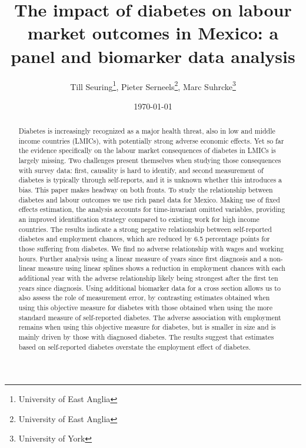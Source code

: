 \documentclass[12pt,english,british]{article}
\begin{document}
\title{The impact of diabetes on labour market outcomes in Mexico: a panel and biomarker data analysis}

\author{Till Seuring\footnote{University of East Anglia}, Pieter
Serneels\footnote{University of East Anglia}, Marc Suhrcke\footnote{University
  of York}}
\affil{}

\date{\today}


\maketitle 

\begin{abstract}
Diabetes is increasingly recognized as a major health threat, also in low and middle income countries (LMICs), with potentially strong adverse economic effects. Yet so far the evidence specifically on the labour market consequences of diabetes in LMICs is largely missing. Two challenges present themselves when studying those consequences with survey data: first, causality is hard to identify, and second measurement of diabetes is typically through self-reports, and it is unknown whether this introduces a bias. This paper makes headway on both fronts. To study the relationship between diabetes and labour outcomes we use rich panel data for Mexico. Making use of fixed effects estimation, the analysis accounts for time-invariant omitted variables, providing an improved identification strategy compared to existing work for high income countries. The results indicate a strong negative relationship between self-reported diabetes and employment chances, which are reduced by 6.5 percentage points for those suffering from diabetes. We find no adverse relationship with wages and working hours. Further analysis using a linear measure of years since first diagnosis and a non-linear measure using linear splines shows a reduction in employment chances with each additional year with the adverse relationship likely being strongest after the first ten years since diagnosis. Using additional biomarker data for a cross section allows us to also assess the role of measurement error, by contrasting estimates obtained when using this objective measure for diabetes with those obtained when using the more standard measure of self-reported diabetes. The adverse association with employment remains when using this objective measure for diabetes, but is smaller in size and is mainly driven by those with diagnosed diabetes. The results suggest that estimates based on self-reported diabetes overstate the employment effect of diabetes.

\end{abstract}
\end{document}
